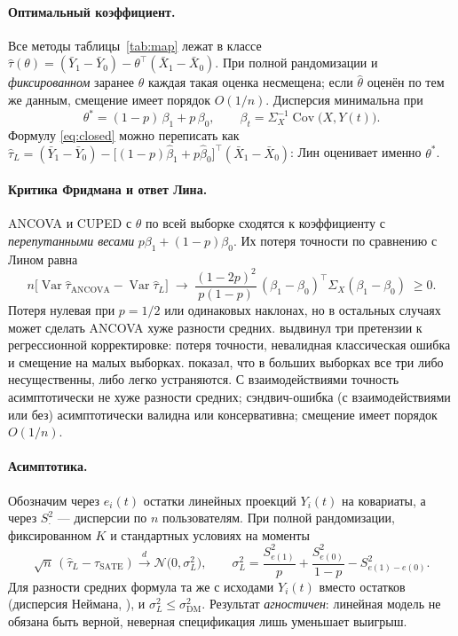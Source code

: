 \documentclass[10pt,a4paper]{article}
\newcommand{\Var}{\operatorname{Var}}
\newcommand{\Cov}{\operatorname{Cov}}
\newcommand{\T}{^{\top}}
\begin{document}
\paragraph{Оптимальный коэффициент.} Все методы таблицы~\ref{tab:map} лежат в классе
$\hat\tau(\theta)=(\bar Y_1-\bar Y_0)-\theta\T(\bar X_1-\bar X_0)$. При полной рандомизации и
\emph{фиксированном} заранее $\theta$ каждая такая оценка несмещена; если $\hat\theta$ оценён по тем же
данным, смещение имеет порядок $O(1/n)$. Дисперсия минимальна при
\begin{equation}\label{eq:theta-star}
\theta^*=(1-p)\,\beta_1+p\,\beta_0,\qquad \beta_t=\Sigma_X^{-1}\Cov\bigl(X,Y(t)\bigr).
\end{equation}
Формулу \eqref{eq:closed} можно переписать как
$\hat\tau_L=(\bar Y_1-\bar Y_0)-\bigl[(1-p)\hat\beta_1+p\hat\beta_0\bigr]\T(\bar X_1-\bar X_0)$:
Лин оценивает именно $\theta^*$.

\paragraph{Критика Фридмана и ответ Лина.} ANCOVA и CUPED с $\theta$ по всей выборке сходятся к коэффициенту с
\emph{перепутанными весами} $p\beta_1+(1-p)\beta_0$. Их потеря точности по сравнению с Лином равна
\begin{equation}\label{eq:freedman-loss}
n\bigl[\Var\hat\tau_{\text{ANCOVA}}-\Var\hat\tau_L\bigr]\;\to\;
\frac{(1-2p)^2}{p(1-p)}\,(\beta_1-\beta_0)\T\Sigma_X(\beta_1-\beta_0)\;\ge 0 .
\end{equation}
Потеря нулевая при $p=1/2$ или одинаковых наклонах, но в остальных случаях может сделать ANCOVA хуже
разности средних. \citet{freedman2008} выдвинул три претензии к регрессионной корректировке: потеря точности,
невалидная классическая ошибка и смещение на малых выборках. \citet{lin2013} показал, что в больших выборках
все три либо несущественны, либо легко устраняются. С взаимодействиями точность асимптотически не хуже
разности средних; сэндвич-ошибка (с взаимодействиями или без) асимптотически валидна или консервативна;
смещение имеет порядок $O(1/n)$.

\paragraph{Асимптотика.} Обозначим через $e_i(t)$ остатки линейных проекций $Y_i(t)$ на ковариаты, а через
$S^2_{\cdot}$ --- дисперсии по $n$ пользователям. При полной рандомизации, фиксированном $K$ и стандартных
условиях на моменты \citep{lin2013, lidingclt2017}
\begin{equation}\label{eq:avar}
\sqrt n\,(\hat\tau_L-\tau_{\text{SATE}})\xrightarrow{d}\mathcal N\!\bigl(0,\sigma_L^2\bigr),\qquad
\sigma^2_L=\frac{S^2_{e(1)}}{p}+\frac{S^2_{e(0)}}{1-p}-S^2_{e(1)-e(0)} .
\end{equation}
Для разности средних формула та же с исходами $Y_i(t)$ вместо остатков (дисперсия Неймана, \citealp{neyman1923}),
и $\sigma^2_L\le\sigma^2_{\text{DM}}$. Результат \emph{агностичен}: линейная модель не обязана быть верной,
неверная спецификация лишь уменьшает выигрыш.
\end{document}
